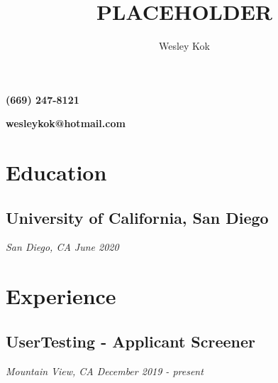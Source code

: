 \documentclass{article}
\makeatletter
\renewcommand{\maketitle}{

{\noindent\huge\bf\theauthor} 

\vspace{-1em}\hfill\large\bf (669) 247-8121

{\noindent \Huge \href{https://github.com/WKhiro}{\faGithub} \href{https://www.linkedin.com/in/wesley-kok/}{\faLinkedin}}

\vspace{-1.5em} \hfill \large \bf wesleykok@hotmail.com

}
\makeatother
\begin{document}
\title{PLACEHOLDER}
\author{Wesley Kok}

\maketitle

\section{Education}
\subsection{University of California, San Diego} \it \quad San Diego, CA \hfill June 2020

\section{Experience}
\subsection{UserTesting - Applicant Screener} \it \quad Mountain View, CA \hfill December 2019 - present
\end{document}
